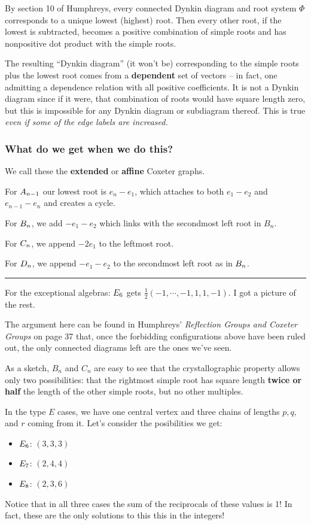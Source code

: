 \documentclass[12pt]{article}
\theoremstyle{nonumberbreak}
\theoremstyle{changebreak}
\theoremstyle{nonumberbreak}
\theoremstyle{change}
\newcommand*{\brk}{
\rule{2in}{.1pt}
}
\let\tilde\relax
\newcommand*{\tilde}[1]{\widetilde{#1}}
\begin{document}
By section 10 of Humphreys, every connected Dynkin diagram and root system $\Phi$ corresponds to a unique lowest (highest) root.
Then every other root, if the lowest is subtracted, becomes a positive combination of simple roots and has nonpositive dot
product with the simple roots.

The resulting ``Dynkin diagram'' (it won't be) corresponding to the simple roots plus the lowest root 
comes from a \textbf{dependent} set of vectors -- in fact, one admitting a dependence relation with all
positive coefficients. It is not a Dynkin diagram since if it were, that combination of roots would have square length zero,
but this is impossible for any Dynkin diagram or subdiagram thereof. This is true \textit{even if some of the edge labels are increased.}

\subsubsection{What do we get when we do this?}
We call these the \textbf{extended} or \textbf{affine} Coxeter graphs.

For $\tilde A_{n-1}$ our lowest root is $e_n-e_1$, which attaches to both $e_1-e_2$ and $e_{n-1}-e_n$ and creates a cycle.

For $\tilde B_{n}$, we add $-e_1-e_2$ which links with the secondmost left root in $B_n$.

For $\tilde C_n$, we append $-2e_1$ to the leftmost root.

For $\tilde D_n$, we append $-e_1-e_2$ to the secondmost left root as in $\tilde B_n$.

\brk

For the exceptional algebras: $\tilde E_6$ gets $\frac{1}{2}(-1,\cdots,-1,1,1,-1)$. I got a picture of the rest.

The argument here can be found in Humphreys' \textit{Reflection Groups and Coxeter Groups} on page 37 that, once the forbidding configurations
above have been ruled out, the only connected diagrams left are the ones we've seen.

As a sketch, $B_n$ and $C_n$ are easy to see that the crystallographic property allows only two 
possibilities: that the rightmost simple root has square length \textbf{twice or half} the length of the other simple roots, but no other multiples.

In the type $E$ cases, we have one central vertex and three chains of lengths $p,q,$ and $r$ coming from it.
Let's consider the posibilities we get:
\begin{itemize}
	\item $\tilde E_6$: $(3,3,3)$
	\item $\tilde E_7$: $(2,4,4)$
	\item $\tilde E_8$: $(2,3,6)$
\end{itemize}
Notice that in all three cases the sum of the reciprocals of these values is 1! In fact, these are the only 
solutions to this this in the integers!
\end{document}
